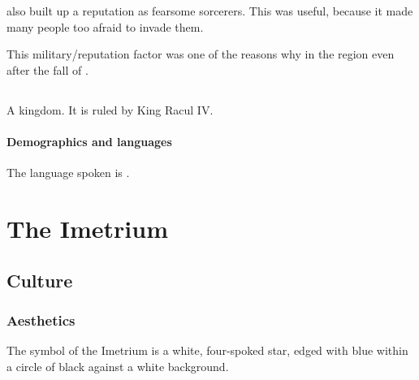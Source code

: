 \Yormis also built up a reputation as fearsome sorcerers.
This was useful, because it made many people too afraid to invade them. 

This military/reputation factor was one of the reasons why  in the region even after the fall of \Ortaica. 















\section[Zarwec]{\Zarwec}
\index{\Zarwec}
A \Serpentine{} kingdom. It is ruled by King Racul IV. 





\subsubsection{Demographics and languages}
The language spoken is \Zarweci. 























\chapter{The Imetrium}









\section{Culture}





\subsection{Aesthetics}
The symbol of the Imetrium is a white, four-spoked star, edged with blue within a circle of black against a white background. 

